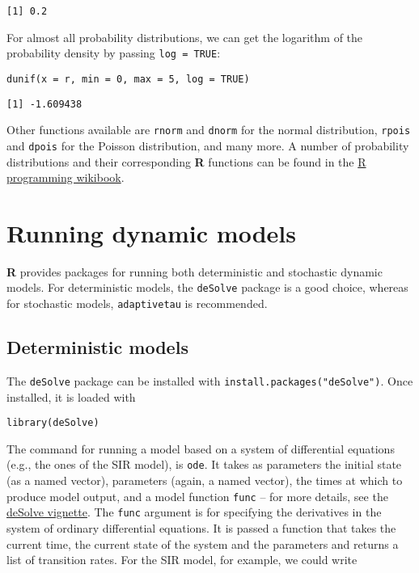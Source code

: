 \documentclass[11pt,a4paper]{article}
\begin{document}
\begin{verbatim}
[1] 0.2
\end{verbatim}

For almost all probability distributions, we can get the logarithm of the probability density by passing \verb~log = TRUE~: \\

\begin{verbatim}
dunif(x = r, min = 0, max = 5, log = TRUE)
\end{verbatim}

\begin{verbatim}
[1] -1.609438
\end{verbatim}

Other functions available are \texttt{rnorm} and \texttt{dnorm} for the normal distribution, \texttt{rpois} and \texttt{dpois} for the Poisson distribution, and many more. A number of probability distributions and their corresponding \textbf{R} functions can be found in the \href{http://en.wikibooks.org/wiki/R_Programming/Probability_Distributions}{R programming wikibook}. \\

\section{Running dynamic models}
\label{sec-6}

\textbf{R} provides packages for running both deterministic and stochastic dynamic models. For deterministic models, the \verb~deSolve~ package is a good choice, whereas for stochastic models, \verb~adaptivetau~ is recommended. \\

\subsection{Deterministic models}
\label{sec-6-1}

The \verb~deSolve~ package can be installed with \verb~install.packages("deSolve")~. Once installed, it is loaded with \\

\begin{verbatim}
library(deSolve)
\end{verbatim}

The command for running a model based on a system of differential equations (e.g., the ones of the SIR model), is \verb~ode~. It takes as parameters the initial state (as a named vector), parameters (again, a named vector), the times at which to produce model output, and a model function \verb~func~ -- for more details, see the \href{http://cran.r-project.org/web/packages/deSolve/vignettes/deSolve.pdf}{deSolve vignette}. The \verb~func~ argument is for specifying the derivatives in the system of ordinary differential equations. It is passed a function that takes the current time, the current state of the system and the parameters and returns a list of transition rates. For the SIR model, for example, we could write \\
\end{document}
